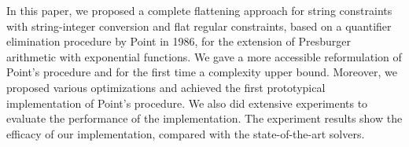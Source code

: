 
In this paper, we proposed a complete flattening approach for string constraints with string-integer conversion and flat regular constraints, based on a quantifier elimination procedure by Point in 1986, for the extension of Presburger arithmetic with exponential functions. We gave a more accessible reformulation of Point's procedure and for the first time a complexity upper bound. Moreover, we proposed various optimizations and achieved the first prototypical implementation of Point's procedure. We also did extensive experiments to evaluate the performance of the implementation. The experiment results show the efficacy of our implementation, compared with the state-of-the-art solvers. 
